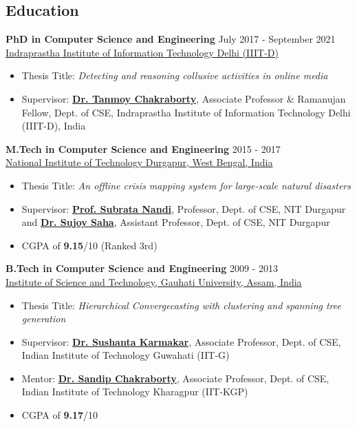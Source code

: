 \documentclass[margin, centered,lmodern]{res}
\begin{document}
\begin{resume}
\section{Education}
\textbf{PhD in Computer Science and Engineering} \hfill July 2017 - September 2021 \\
\href{http://www.iiitd.ac.in/}{Indraprastha Institute of Information Technology Delhi (IIIT-D)}
\begin{itemize}
 \item Thesis Title: \textit{Detecting and reasoning collusive activities in online media}
 \item Supervisor: \href{https://sites.google.com/site/tanmoychakra88/}{\textbf{Dr. Tanmoy Chakraborty}}, Associate Professor \& Ramanujan Fellow, Dept. of CSE, Indraprastha Institute of Information Technology Delhi (IIIT-D), India
\end{itemize}
\textbf{M.Tech in Computer Science and Engineering} \hfill 2015 - 2017 \\
\href{http://www.nitdgp.ac.in/}{National Institute of Technology Durgapur, West Bengal, India}
\begin{itemize}
 \item Thesis Title: \textit{An offline crisis mapping system for large-scale natural disasters}
 \item Supervisor: \href{http://www.nitdgp.ac.in/cse/s_nandi/s_nandi.php}{\textbf{Prof. Subrata Nandi}}, Professor, Dept. of CSE, NIT Durgapur and \href{http://www.nitdgp.ac.in/cse/s_saha/s_saha.php}{\textbf{Dr. Sujoy Saha}}, Assistant Professor, Dept. of CSE, NIT Durgapur
 \item CGPA of \textbf{9.15}/10 (Ranked 3rd)
\end{itemize}
\textbf{B.Tech in Computer Science and Engineering} \hfill 2009 - 2013 \\
\href{http://www.gauhati.ac.in/}{Institute of Science and Technology, Gauhati University, Assam, India}
\begin{itemize}
 \item Thesis Title: \textit{Hierarchical Convergecasting with clustering and spanning tree generation}
 \item Supervisor: \href{https://www.iitg.ac.in/sushantak/}{\textbf{Dr. Sushanta Karmakar}}, Associate Professor, Dept. of CSE, Indian Institute of Technology Guwahati (IIT-G)
 \item Mentor: \href{http://cse.iitkgp.ac.in/~sandipc/}{\textbf{Dr. Sandip Chakraborty}}, Associate Professor, Dept. of CSE, Indian Institute of Technology Kharagpur (IIT-KGP)
 \item CGPA of \textbf{9.17}/10
\end{itemize}
 

\end{resume}
\end{document}
